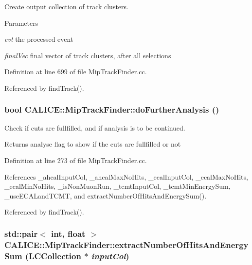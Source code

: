 Create output collection of track clusters. 
\begin{DoxyParams}{Parameters}
\item[{\em evt}]the processed event \item[{\em finalVec}]final vector of track clusters, after all selections \end{DoxyParams}


Definition at line 699 of file MipTrackFinder.cc.

Referenced by findTrack().
\subsubsection[{doFurtherAnalysis}]{\setlength{\rightskip}{0pt plus 5cm}bool CALICE::MipTrackFinder::doFurtherAnalysis ()\hspace{0.3cm}{\ttfamily  [private]}}\label{classCALICE_1_1MipTrackFinder_aab79ba892b9cacc87b2d2983bb859606}


Check if cuts are fullfilled, and if analysis is to be continued. \begin{DoxyReturn}{Returns}
analyse flag to show if the cuts are fullfilled or not 
\end{DoxyReturn}


Definition at line 273 of file MipTrackFinder.cc.

References \_\-ahcalInputCol, \_\-ahcalMaxNoHits, \_\-ecalInputCol, \_\-ecalMaxNoHits, \_\-ecalMinNoHits, \_\-isNonMuonRun, \_\-tcmtInputCol, \_\-tcmtMinEnergySum, \_\-useECALandTCMT, and extractNumberOfHitsAndEnergySum().

Referenced by findTrack().
\subsubsection[{extractNumberOfHitsAndEnergySum}]{\setlength{\rightskip}{0pt plus 5cm}std::pair$<$ int, float $>$ CALICE::MipTrackFinder::extractNumberOfHitsAndEnergySum (LCCollection $\ast$ {\em inputCol})\hspace{0.3cm}{\ttfamily  [private]}}\label{classCALICE_1_1MipTrackFinder_a1aef1a8fd625a33ec44d91dab476b45c}


